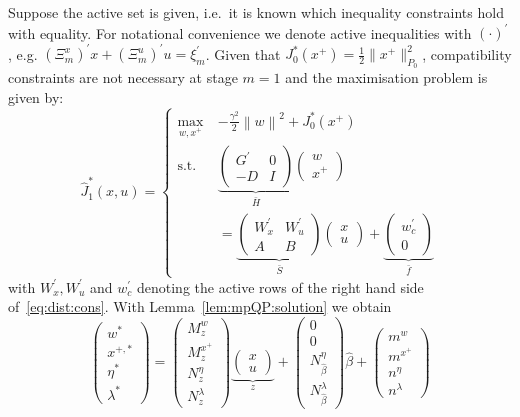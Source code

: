 \documentclass{ifacconf}
\providecommand{\norm}[1]{\left\|#1\right\|}
\begin{document}
Suppose the active set is given, i.e.~it is known which inequality constraints hold with equality. 
For notational convenience we denote active inequalities with $(\cdot)^\prime$, e.g.  $(\Xi^x_m)^\prime x + (\Xi^u_m)^\prime u = \xi_m^\prime$. 
Given that $J^\ast_0(x^+) = \frac{1}{2}\|x^+\|_{P_0}^2$, compatibility constraints are not necessary at 
stage $m=1$ and the maximisation problem is given by:
\[
	\hat J_1^\ast(x,u) = \left\{\begin{split}
	\max_{w,x^+} \ & {-\frac{\gamma^2}{2}}\norm{w}^2 + J_{0}^\ast(x^+)\\
	\text{s.t. }\ & 
	\underbrace{\left(\begin{array}{cc}
	G^\prime & 0 \\ -D & I
	\end{array}\right)}_{\bar H}
	\left(\begin{array}{c}w\\ x^+\end{array}\right)
	\\&= \underbrace{\left(\begin{array}{cc}W_x^\prime & W_u^\prime \\ A & B\end{array}\right)}_{
	\bar S
	}
	\left(\begin{array}{c}x \\ u \end{array}\right) + \underbrace{\left(\begin{array}{c}
	w_c^\prime \\ 0\end{array}\right)}_{\bar f}
	\end{split}\right.
\]
with $W_x^\prime, W_u^\prime$ and $w_c^\prime$ denoting the active rows of the right hand side 
of~\eqref{eq:dist:cons}.
With Lemma~\ref{lem:mpQP:solution} we obtain
\[
      \left(\begin{array}{c}
      w^\ast \\
      x^{+,\ast} \\
      \eta^\ast \\
      \lambda^\ast
      \end{array}\right) = \left(\begin{array}{c}M^w_z\\ M^{x^+}_z \\ N^{\eta}_z \\ N^{\lambda}_z
      \end{array}\right)\underbrace{\left(\begin{array}{c}x\\ u\end{array}\right)}_z + 
      \left(\begin{array}{c}0\\ 0 \\ N^{\eta}_{\hat\beta} \\ N^{\lambda}_{\hat\beta}
      \end{array}\right)\hat\beta + \left(\begin{array}{c}m^w\\ m^{x^+} \\ n^{\eta} \\ n^{\lambda}
      \end{array}\right)
\]
\end{document}
